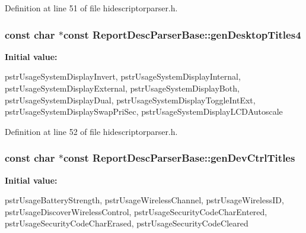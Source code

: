 \-Definition at line 51 of file hidescriptorparser.\-h.

\hypertarget{class_report_desc_parser_base_ae2b1ca00d24f5c3867c90ea49ffa6e0d}{
\subsubsection[{gen\-Desktop\-Titles4}]{\setlength{\rightskip}{0pt plus 5cm}const char $\ast$const {\bf \-Report\-Desc\-Parser\-Base\-::gen\-Desktop\-Titles4}}}\label{class_report_desc_parser_base_ae2b1ca00d24f5c3867c90ea49ffa6e0d}
{\bfseries \-Initial value\-:}
\begin{DoxyCode}
 {
        pstrUsageSystemDisplayInvert,
        pstrUsageSystemDisplayInternal,
        pstrUsageSystemDisplayExternal,
        pstrUsageSystemDisplayBoth,
        pstrUsageSystemDisplayDual,
        pstrUsageSystemDisplayToggleIntExt,
        pstrUsageSystemDisplaySwapPriSec,
        pstrUsageSystemDisplayLCDAutoscale
}
\end{DoxyCode}


\-Definition at line 52 of file hidescriptorparser.\-h.

\hypertarget{class_report_desc_parser_base_a55e8f870eb0006bc3a9ca42e6cabf187}{
\subsubsection[{gen\-Dev\-Ctrl\-Titles}]{\setlength{\rightskip}{0pt plus 5cm}const char $\ast$const {\bf \-Report\-Desc\-Parser\-Base\-::gen\-Dev\-Ctrl\-Titles}}}\label{class_report_desc_parser_base_a55e8f870eb0006bc3a9ca42e6cabf187}
{\bfseries \-Initial value\-:}
\begin{DoxyCode}
 {
        pstrUsageBatteryStrength,
        pstrUsageWirelessChannel,
        pstrUsageWirelessID,
        pstrUsageDiscoverWirelessControl,
        pstrUsageSecurityCodeCharEntered,
        pstrUsageSecurityCodeCharErased,
        pstrUsageSecurityCodeCleared
}
\end{DoxyCode}


